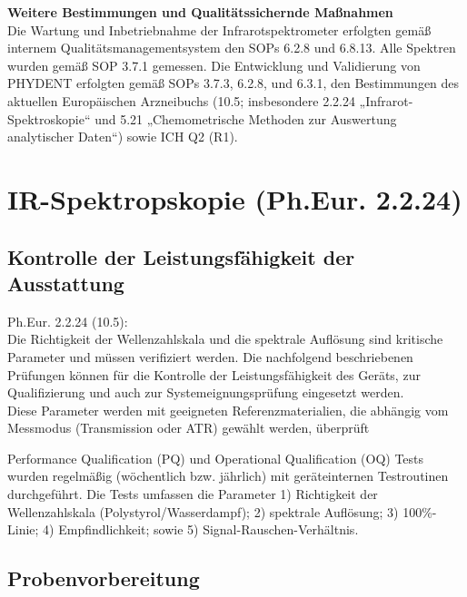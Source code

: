 \documentclass[11pt, a4paper]{article}
\newcommand\VersionPhEur{10.5}
\begin{document}
\textbf{Weitere Bestimmungen und Qualitätssichernde Maßnahmen}\\[1.2pt]
Die Wartung und Inbetriebnahme der Infrarotspektrometer erfolgten gemäß internem Qualitätsmanagementsystem den SOPs 6.2.8 und 6.8.13. Alle Spektren wurden gemäß SOP 3.7.1 gemessen. Die Entwicklung und Validierung von PHYDENT erfolgten gemäß SOPs 3.7.3, 6.2.8, und 6.3.1, den Bestimmungen des aktuellen Europäischen Arzneibuchs (\VersionPhEur; insbesondere 2.2.24 „Infrarot-Spektroskopie“ und 5.21 „Chemometrische Methoden zur Auswertung analytischer Daten“) sowie ICH Q2 (R1).


\section{IR-Spektropskopie (Ph.Eur. 2.2.24)}
\label{append:IR-Spektropskopie}

\subsection{Kontrolle der Leistungsfähigkeit der Ausstattung}
\begin{framed}
Ph.Eur. 2.2.24 (\VersionPhEur): \\

Die Richtigkeit der Wellenzahlskala und die spektrale Auflösung sind kritische Parameter und müssen verifiziert werden. Die nachfolgend beschriebenen Prüfungen können für die Kontrolle der Leistungsfähigkeit des Geräts, zur Qualifizierung und auch zur Systemeignungsprüfung eingesetzt werden.\\

Diese Parameter werden mit geeigneten Referenzmaterialien, die abhängig vom Messmodus (Transmission oder ATR) gewählt werden, überprüft
\end{framed}

Performance Qualification (PQ) und Operational Qualification (OQ) Tests wurden regelmäßig (wöchentlich bzw. jährlich) mit geräteinternen Testroutinen durchgeführt. Die Tests umfassen die Parameter 1) Richtigkeit der Wellenzahlskala (Polystyrol/Wasserdampf); 2) spektrale Auflösung; 3) 100\%-Linie; 4) Empfindlichkeit; sowie 5) Signal-Rauschen-Verhältnis.

\subsection{Probenvorbereitung}
\end{document}
